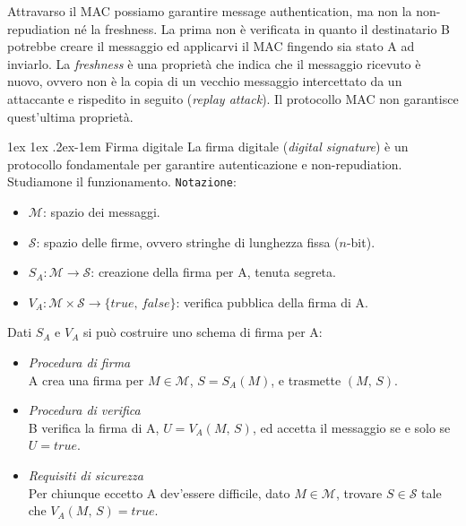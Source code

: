 \documentclass[a4paper, 11pt, twoside, openright, fleqn]{report}
\makeatletter
\renewcommand{\paragraph}{%
	\@startsection{paragraph}{4}%
	{\z@}{1ex \@plus 1ex \@minus .2ex}{-1em}%
	{\normalfont\normalsize\bfseries}%
}
\makeatother
\begin{document}
Attravarso il MAC possiamo garantire message authentication, ma non la non-repudiation né la freshness. La prima non è verificata in quanto il destinatario B potrebbe creare il messaggio ed applicarvi il MAC fingendo sia stato A ad inviarlo. La \emph{freshness} è una proprietà che indica che il messaggio ricevuto è nuovo, ovvero non è la copia di un vecchio messaggio intercettato da un attaccante e rispedito in seguito (\emph{replay attack}). Il protocollo MAC non garantisce quest'ultima proprietà.

\paragraph{Firma digitale}
La firma digitale (\emph{digital signature}) è un protocollo fondamentale per garantire autenticazione e non-repudiation. Studiamone il funzionamento.
\texttt{Notazione}:
\begin{itemize}
	\item $\mathcal{M}$: spazio dei messaggi.
	\item $\mathcal{S}$: spazio delle firme, ovvero stringhe di lunghezza fissa ($n$-bit).
	\item $S_A\!:\mathcal{M}\rightarrow \mathcal{S}$: creazione della firma per A, tenuta segreta.
	\item $V_A\!: \mathcal{M}\times \mathcal{S}\rightarrow\{true,\,false\}$: verifica pubblica della firma di A.
\end{itemize}
Dati $S_A$ e $V_A$ si può costruire uno schema di firma per A:
\begin{itemize}
	\item \emph{Procedura di firma}\\
	A crea una firma per $M\in\mathcal{M}$, $S=S_A(M)$, e trasmette $(M,\,S)$.
	\item \emph{Procedura di verifica}\\
	B verifica la firma di A, $U=V_A(M,\,S)$, ed accetta il messaggio se e solo se $U=true$.
	\item \emph{Requisiti di sicurezza}\\
	Per chiunque eccetto A dev'essere difficile, dato $M\in\mathcal{M}$, trovare $S\in\mathcal{S}$ tale che $V_A(M,\,S)=true$.
\end{itemize}
\end{document}
